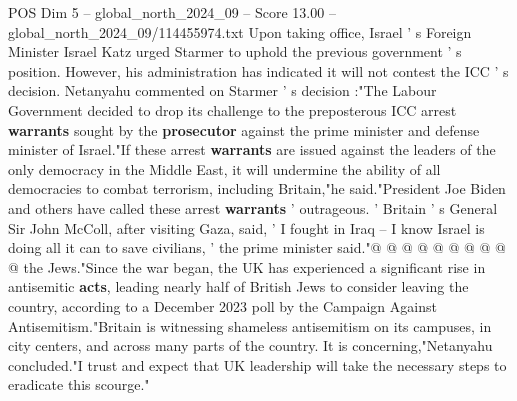 \begin{textsample}{POS Dim 5 – global\_north\_2024\_09 – Score 13.00 – global\_north\_2024\_09/114455974.txt}
Upon taking office, Israel ' s Foreign Minister Israel Katz urged Starmer to uphold the previous government ' s position.
However, his administration has indicated it will not contest the ICC ' s decision.
Netanyahu commented on Starmer ' s decision :"The Labour Government decided to drop its challenge to the preposterous ICC arrest \textbf{warrants} sought by the \textbf{prosecutor} against the prime minister and defense minister of Israel."If these arrest \textbf{warrants} are issued against the leaders of the only democracy in the Middle East, it will undermine the ability of all democracies to combat terrorism, including Britain,"he said."President Joe Biden and others have called these arrest \textbf{warrants} ' outrageous. ' Britain ' s General Sir John McColl, after visiting Gaza, said, ' I fought in Iraq -- I know Israel is doing all it can to save civilians, ' the prime minister said."@ @ @ @ @ @ @ @ @ @ the Jews."Since the war began, the UK has experienced a significant rise in antisemitic \textbf{acts}, leading nearly half of British Jews to consider leaving the country, according to a December 2023 poll by the Campaign Against Antisemitism."Britain is witnessing shameless antisemitism on its campuses, in city centers, and across many parts of the country.
It is concerning,"Netanyahu concluded."I trust and expect that UK leadership will take the necessary steps to eradicate this scourge."

\end{textsample}
